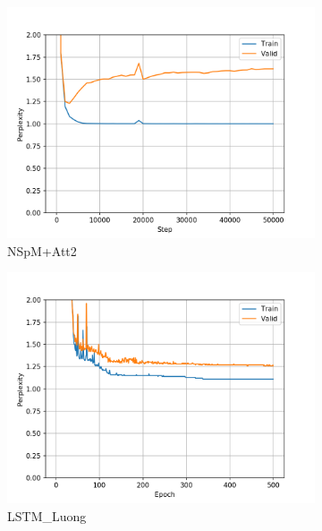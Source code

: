 \begin{figure}[h]
\begin{subfigure}{0.3\textwidth}
\includegraphics[width=\textwidth]{../results/monument2_2/run1/neural_sparql_machine_luong_attention/ppls.png} 
\caption{NSpM+Att2}
\label{fig:monu2 nsm-luo ppl}
\end{subfigure}
\hfill
\begin{subfigure}{0.3\textwidth}
\includegraphics[width=\textwidth]{../results/monument2_2/run1/lstm_luong_wmt_en_de/ppls.png}
\caption{LSTM\_Luong}
\label{fig:monu2 lstm ppl}
\end{subfigure}
\hfill
\begin{subfigure}{0.3\textwidth}

\end{subfigure}
\end{figure}
